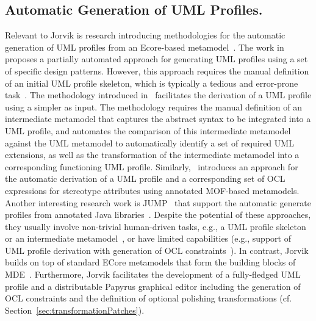 \subsection{Automatic Generation of UML Profiles.}
Relevant to Jorvik is research introducing methodologies for the automatic 
generation of UML profiles from an Ecore-based metamodel~\cite{Kraas17}. 
The work in~\cite{Lagarde2008:FASE} proposes a partially automated approach for 
generating UML profiles using a set of specific design patterns. However, this 
approach requires the manual definition of an initial UML profile skeleton, 
which is typically a tedious and error-prone task~\cite{Wimmer2009:IJWIS}. 
The methodology introduced in~\cite{Giachetti2008:ER,Giachetti2009:CAISE} 
facilitates the derivation of a UML profile using a simpler as input. 
The methodology requires the manual definition of an intermediate metamodel 
that captures the abstract syntax to be integrated into a UML profile, and 
automates the comparison of this intermediate metamodel against the UML 
metamodel to automatically identify a set of required UML extensions, as well 
as the transformation of the intermediate metamodel into a corresponding 
functioning UML profile. 
Similarly,~\cite{Kraas17} introduces an approach for the automatic derivation of a UML profile and a corresponding set of OCL expressions
for stereotype attributes using annotated MOF-based metamodels.
Another interesting research work is JUMP~\cite{Bergmayr2014:MODELS} that support the automatic generate profiles from annotated Java libraries~\cite{Bergmayr2014:MODELS}.
Despite the potential of these approaches, they usually involve
non-trivial human-driven tasks, e.g., a UML profile 
skeleton~\cite{Lagarde2008:FASE} or an intermediate 
metamodel~\cite{Giachetti2008:ER,Giachetti2009:CAISE}, or have limited capabilities (e.g., support of UML profile derivation with generation of OCL constraints~\cite{Kraas17}). In contrast, Jorvik builds on top of standard ECore metamodels that form the building blocks of MDE~\cite{omg2014meta}. 
Furthermore, Jorvik facilitates the development of a fully-fledged UML profile and a distributable Papyrus graphical editor including the generation of OCL constraints and the definition of optional polishing transformations (cf. 
Section~\ref{sec:transformationPatches}).


